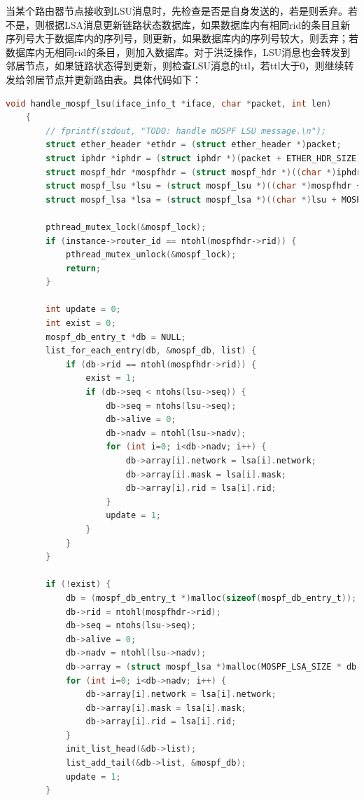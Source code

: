 \documentclass[UTF8]{report}
\begin{document}
当某个路由器节点接收到LSU消息时，先检查是否是自身发送的，若是则丢弃。若不是，则根据LSA消息更新链路状态数据库，如果数据库内有相同rid的条目且新序列号大于数据库内的序列号，则更新，如果数据库内的序列号较大，则丢弃；若数据库内无相同rid的条目，则加入数据库。对于洪泛操作，LSU消息也会转发到邻居节点，如果链路状态得到更新，则检查LSU消息的ttl，若ttl大于0，则继续转发给邻居节点并更新路由表。具体代码如下：

\begin{lstlisting}[language=C]
    void handle_mospf_lsu(iface_info_t *iface, char *packet, int len)
    {
        // fprintf(stdout, "TODO: handle mOSPF LSU message.\n");
        struct ether_header *ethdr = (struct ether_header *)packet;
        struct iphdr *iphdr = (struct iphdr *)(packet + ETHER_HDR_SIZE);
        struct mospf_hdr *mospfhdr = (struct mospf_hdr *)((char *)iphdr + IP_HDR_SIZE(iphdr));
        struct mospf_lsu *lsu = (struct mospf_lsu *)((char *)mospfhdr + MOSPF_HDR_SIZE);
        struct mospf_lsa *lsa = (struct mospf_lsa *)((char *)lsu + MOSPF_LSU_SIZE);
    
        pthread_mutex_lock(&mospf_lock);
        if (instance->router_id == ntohl(mospfhdr->rid)) {
            pthread_mutex_unlock(&mospf_lock);
            return;
        }
    
        int update = 0;
        int exist = 0;
        mospf_db_entry_t *db = NULL;
        list_for_each_entry(db, &mospf_db, list) {
            if (db->rid == ntohl(mospfhdr->rid)) {
                exist = 1;
                if (db->seq < ntohs(lsu->seq)) {
                    db->seq = ntohs(lsu->seq);
                    db->alive = 0;
                    db->nadv = ntohl(lsu->nadv);
                    for (int i=0; i<db->nadv; i++) {
                        db->array[i].network = lsa[i].network;
                        db->array[i].mask = lsa[i].mask;
                        db->array[i].rid = lsa[i].rid;
                    }
                    update = 1;
                }
            }
        }
    
        if (!exist) {
            db = (mospf_db_entry_t *)malloc(sizeof(mospf_db_entry_t));
            db->rid = ntohl(mospfhdr->rid);
            db->seq = ntohs(lsu->seq);
            db->alive = 0;
            db->nadv = ntohl(lsu->nadv);
            db->array = (struct mospf_lsa *)malloc(MOSPF_LSA_SIZE * db->nadv);
            for (int i=0; i<db->nadv; i++) {
                db->array[i].network = lsa[i].network;
                db->array[i].mask = lsa[i].mask;
                db->array[i].rid = lsa[i].rid;
            }
            init_list_head(&db->list);
            list_add_tail(&db->list, &mospf_db);
            update = 1;
        }
    

\end{lstlisting}
\end{document}
